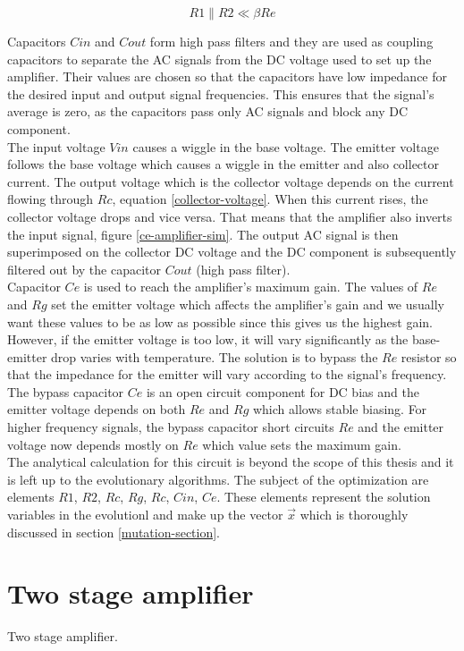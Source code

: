 \begin{equation} \label{divider-impedance}
    R1 \| R2 \ll \beta Re
\end{equation}

Capacitors $Cin$ and $Cout$ form high pass filters and they are used as coupling capacitors to separate the AC signals from the DC voltage used to set up the amplifier. Their values are chosen so that the capacitors have low impedance for the desired input and output signal frequencies. This ensures that the signal's average is zero, as the capacitors pass only AC signals and block any DC component.\\
The input voltage $Vin$ causes a wiggle in the base voltage. The emitter voltage follows the base voltage which causes a wiggle in the emitter and also collector current. The output voltage which is the collector voltage depends on the current flowing through $Rc$, equation \ref{collector-voltage}. When this current rises, the collector voltage drops and vice versa. That means that the amplifier also inverts the input signal, figure \ref{ce-amplifier-sim}. The output AC signal is then superimposed on the collector DC voltage and the DC component is subsequently filtered out by the capacitor $Cout$ (high pass filter).\\
Capacitor $Ce$ is used to reach the amplifier's maximum gain. The values of $Re$ and $Rg$ set the emitter voltage which affects the amplifier's gain and we usually want these values to be as low as possible since this gives us the highest gain. However, if the emitter voltage is too low, it will vary significantly as the base-emitter drop varies with temperature. The solution is to bypass the $Re$ resistor so that the impedance for the emitter will vary according to the signal's frequency. The bypass capacitor $Ce$ is an open circuit component for DC bias and the emitter voltage depends on both $Re$ and $Rg$ which allows stable biasing. For higher frequency signals, the bypass capacitor short circuits $Re$ and the emitter voltage now depends mostly on $Re$ which value sets the maximum gain.\\
The analytical calculation for this circuit is beyond the scope of this thesis and it is left up to the evolutionary algorithms. The subject of the optimization are elements $R1$, $R2$, $Rc$, $Rg$, $Rc$, $Cin$, $Ce$. These elements represent the solution variables in the evolutionl and make up the vector $\vec{x}$ which is thoroughly discussed in section \ref{mutation-section}.

\section{Two stage amplifier}
Two stage amplifier.

